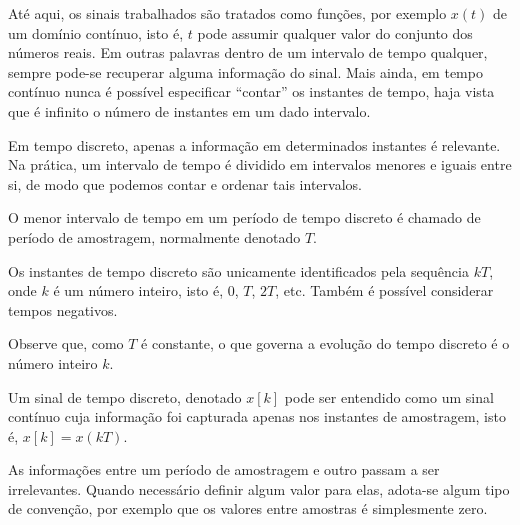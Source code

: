 \documentclass[12pt, a4paper]{article}
\begin{document}
Até aqui, os sinais trabalhados são tratados como funções, por exemplo $x(t)$ de um domínio contínuo, isto é, $t$ pode assumir qualquer valor do conjunto dos números reais. Em outras palavras dentro de um intervalo de tempo qualquer, sempre pode-se recuperar alguma informação do sinal. Mais ainda, em tempo contínuo nunca é possível especificar ``contar'' os instantes de tempo, haja vista que é infinito o número de instantes em um dado intervalo.

Em tempo discreto, apenas a informação em determinados instantes é relevante. Na prática, um intervalo de tempo é dividido em intervalos menores e iguais entre si, de modo que podemos contar e ordenar tais intervalos.

O menor intervalo de tempo em um período de tempo discreto é chamado de período de amostragem, normalmente denotado $T$.  

Os instantes de tempo discreto são unicamente identificados pela sequência $kT$, onde $k$ é um número inteiro, isto é, $0$, $T$, $2T$, etc. Também é possível considerar tempos negativos.

Observe que, como $T$ é constante, o que governa a evolução do tempo discreto é o número inteiro $k$.

Um sinal de tempo discreto, denotado $x[k]$ pode ser entendido como um sinal contínuo cuja informação foi capturada apenas nos instantes de amostragem, isto é, $x[k]=x(kT)$.

As informações entre um período de amostragem e outro passam a ser irrelevantes. Quando necessário definir algum valor para elas, adota-se algum tipo de convenção, por exemplo que os valores entre amostras é simplesmente zero.
\end{document}

